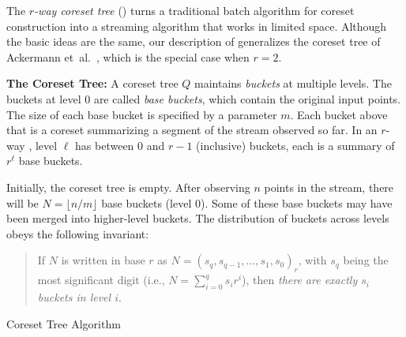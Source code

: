 \newcommand*{\qtree}[0]{\ensuremath{Q}\xspace}
The \emph{$r$-way coreset tree} (\ct{}) turns a traditional batch algorithm for
coreset construction into a streaming algorithm that works in limited space.
Although the basic ideas are the same, our description of \ct{} generalizes the
coreset tree of Ackermann et~al.~\cite{AMR+12}, which is the special case when
$r = 2$.



\noindent\textbf{The Coreset Tree:}
A coreset tree $\qtree$ maintains \emph{buckets} at multiple levels.  The
buckets at level $0$ are called \emph{base buckets}, which contain the original
input points.  The size of each base bucket is specified by a parameter $m$.
Each bucket above that is a coreset summarizing a segment of the stream observed
so far.  In an $r$-way \ct, level $\ell$ has between $0$ and $r-1$ (inclusive)
buckets, each is a summary of $r^\ell$ base buckets.

Initially, the coreset tree is empty. After observing $n$ points in the stream,
there will be $N = \lfloor n/m \rfloor$ base buckets (level 0). Some of these
base buckets may have been merged into higher-level buckets.  The distribution
of buckets across levels obeys the following invariant:
\begin{quote}
  If $N$ is written in base $r$ as $N = (s_q, s_{q-1}, \dots, s_1, s_0)_r$, with
  $s_q$ being the most significant digit (i.e., $N = \sum_{i=0}^q s_ir^i$), then
  \emph{there are exactly $s_i$ buckets in level $i$}.
\end{quote}




\begin{algorithm}[t]
\caption{Coreset Tree Algorithm}\label{algo:ctfunctions}
\label{algo:ctinit}
\label{algo:ctupdate}
\label{algo:ctquery}
\end{algorithm}



